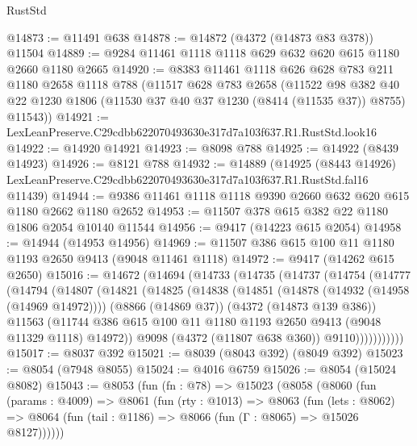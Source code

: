 \begin{lexlean}{RustStd}
\begin{coremodule}
@14873 := @11491 @638
@14878 := @14872 (@4372 (@14873 @83 @378)) @11504
@14889 := @9284 @11461 @1118 @1118 @629 @632 @620 @615 @1180 @2660 @1180 @2665
@14920 := @8383
    @11461
    @1118
    @626
    @628
    @783
    @211
    @1180
    @2658
    @1118
    @788
    (@11517
      @628
      @783
      @2658
      (@11522
        @98
        @382
        @40
        @22
        @1230
        @1806
        (@11530 @37 @40 @37 @1230 (@8414 (@11535 @37)) @8755)
        @11543))
@14921 := LexLeanPreserve.C29cdbb622070493630e317d7a103f637.R1.RustStd.look16
@14922 := @14920 @14921
@14923 := @8098 @788
@14925 := @14922 (@8439 @14923)
@14926 := @8121 @788
@14932 := @14889
    (@14925
      (@8443 @14926)
      LexLeanPreserve.C29cdbb622070493630e317d7a103f637.R1.RustStd.fal16
      @11439)
@14944 := @9386 @11461 @1118 @1118 @9390 @2660 @632 @620 @615 @1180 @2662 @1180 @2652
@14953 := @11507 @378 @615 @382 @22 @1180 @1806 @2054 @10140 @11544
@14956 := @9417 (@14223 @615 @2054)
@14958 := @14944 (@14953 @14956)
@14969 := @11507 @386 @615 @100 @11 @1180 @1193 @2650 @9413 (@9048 @11461 @1118)
@14972 := @9417 (@14262 @615 @2650)
@15016 := @14672
    (@14694
      (@14733
        (@14735
          (@14737
            (@14754
              (@14777
                (@14794
                  (@14807
                    (@14821
                      (@14825
                        (@14838
                          (@14851
                            (@14878 (@14932 (@14958 (@14969 @14972))))
                            (@8866 (@14869 @37))
                            (@4372 (@14873 @139 @386))
                            @11563
                            (@11744
                              @386
                              @615
                              @100
                              @11
                              @1180
                              @1193
                              @2650
                              @9413
                              (@9048 @11329 @1118)
                              @14972))
                          @9098
                          (@4372 (@11807 @638 @360))
                          @9110)))))))))))
@15017 := @8037 @392
@15021 := @8039 (@8043 @392) (@8049 @392)
@15023 := @8054 (@7948 @8055)
@15024 := @4016 @6759
@15026 := @8054 (@15024 @8082)
@15043 := @8053
    (fun (fn : @78) =>
    @15023
      (@8058
        (@8060
          (fun (params : @4009) =>
          @8061
            (fun (rty : @1013) =>
            @8063
              (fun (lets : @8062) =>
              @8064 (fun (tail : @1186) => @8066 (fun (Γ : @8065) => @15026 @8127))))))

\end{coremodule}
\end{lexlean}
